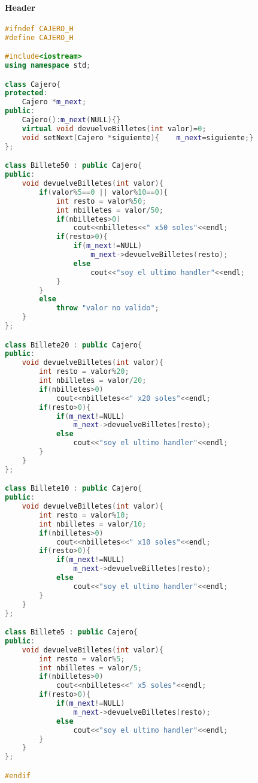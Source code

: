 \documentclass[a4paper,10pt]{article}
\begin{document}
\paragraph{Header}
\begin{lstlisting}[language=C++]
#ifndef CAJERO_H
#define CAJERO_H

#include<iostream>
using namespace std;

class Cajero{
protected:
    Cajero *m_next;
public:
    Cajero():m_next(NULL){}
    virtual void devuelveBilletes(int valor)=0;
    void setNext(Cajero *siguiente){    m_next=siguiente;}
};

class Billete50 : public Cajero{
public:
    void devuelveBilletes(int valor){
        if(valor%5==0 || valor%10==0){
            int resto = valor%50;
            int nbilletes = valor/50;
            if(nbilletes>0)
                cout<<nbilletes<<" x50 soles"<<endl;
            if(resto>0){
                if(m_next!=NULL)
                    m_next->devuelveBilletes(resto);
                else
                    cout<<"soy el ultimo handler"<<endl;
            }
        }
        else
            throw "valor no valido";
    }
};

class Billete20 : public Cajero{
public:
    void devuelveBilletes(int valor){
        int resto = valor%20;
        int nbilletes = valor/20;
        if(nbilletes>0)
            cout<<nbilletes<<" x20 soles"<<endl;
        if(resto>0){
            if(m_next!=NULL)
                m_next->devuelveBilletes(resto);
            else
                cout<<"soy el ultimo handler"<<endl;
        }
    }
};

class Billete10 : public Cajero{
public:
    void devuelveBilletes(int valor){
        int resto = valor%10;
        int nbilletes = valor/10;
        if(nbilletes>0)
            cout<<nbilletes<<" x10 soles"<<endl;
        if(resto>0){
            if(m_next!=NULL)
                m_next->devuelveBilletes(resto);
            else
                cout<<"soy el ultimo handler"<<endl;
        }
    }
};

class Billete5 : public Cajero{
public:
    void devuelveBilletes(int valor){
        int resto = valor%5;
        int nbilletes = valor/5;
        if(nbilletes>0)
            cout<<nbilletes<<" x5 soles"<<endl;
        if(resto>0){
            if(m_next!=NULL)
                m_next->devuelveBilletes(resto);
            else
                cout<<"soy el ultimo handler"<<endl;
        }
    }
};

#endif
\end{lstlisting}
\end{document}
